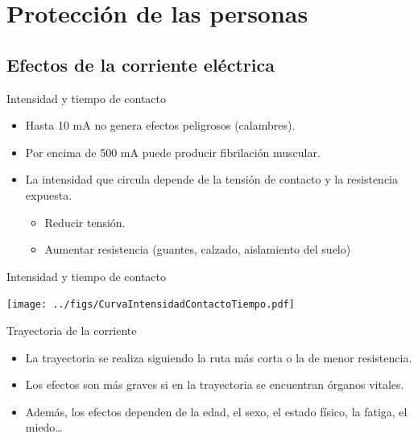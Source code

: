 \documentclass[aspectratio=169, usenames,svgnames,dvipsnames]{beamer}
\begin{document}
\section{Protección de las personas}
\label{sec:org93a5082}

\subsection{Efectos de la corriente eléctrica}
\label{sec:org63fb3be}

\begin{frame}[label={sec:org4897af0}]{Intensidad y tiempo de contacto}
\begin{itemize}
\item Hasta 10 mA no genera efectos peligrosos (calambres).

\item Por encima de 500 mA puede producir fibrilación muscular.

\item La \alert{intensidad} que circula \alert{depende de la tensión de contacto y la
resistencia expuesta}.

\begin{itemize}
\item Reducir tensión.

\item Aumentar resistencia (guantes, calzado, aislamiento del suelo)
\end{itemize}
\end{itemize}
\end{frame}

\begin{frame}[label={sec:org35eab40}]{Intensidad y tiempo de contacto}
\begin{center}
\texttt{[image: ../figs/CurvaIntensidadContactoTiempo.pdf]}
\end{center}
\end{frame}

\begin{frame}[label={sec:orgd9142d0}]{Trayectoria de la corriente}
\begin{itemize}
\item La trayectoria se realiza siguiendo la ruta más corta o la de menor
resistencia.

\item Los efectos son más graves si en la trayectoria se encuentran órganos
vitales.

\item Además, los efectos dependen de la edad, el sexo, el estado físico,
la fatiga, el miedo\ldots{}
\end{itemize}
\end{frame}
\end{document}
